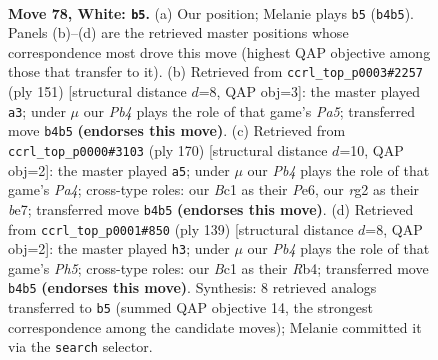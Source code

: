 \documentclass[11pt]{article}
\begin{document}
\clearpage

\begin{figure}[p]\centering
\begin{subfigure}{0.46\textwidth}\centering
\resizebox{\linewidth}{!}{%
\newchessgame
\chessboard[
  setfen={4b2k/8/1R6/8/1P6/8/K1p3r1/2B5 w - - 8 78},
  showmover=false,
  pgfstyle=straightmove, color=movearrow, markmove={b4-b5}
]}
\caption{}
\end{subfigure}\hfill
\begin{subfigure}{0.46\textwidth}\centering
\resizebox{\linewidth}{!}{%
\newchessgame
\chessboard[
  setfen={4k3/8/3R4/8/p7/3P2K1/r7/8 b - - 3 76},
  showmover=false,
  pgfstyle=straightmove, color=movearrow, markmove={a4-a3}
]}
\caption{}
\end{subfigure}
\\[4pt]
\begin{subfigure}{0.46\textwidth}\centering
\resizebox{\linewidth}{!}{%
\newchessgame
\chessboard[
  setfen={1r6/4b2k/4P3/8/P1K5/8/8/R7 w - - 5 86},
  showmover=false,
  pgfstyle=straightmove, color=movearrow, markmove={a4-a5}
]}
\caption{}
\end{subfigure}\hfill
\begin{subfigure}{0.46\textwidth}\centering
\resizebox{\linewidth}{!}{%
\newchessgame
\chessboard[
  setfen={2K5/8/2P1k3/8/1r5p/8/8/2R5 b - - 0 70},
  showmover=false,
  pgfstyle=straightmove, color=movearrow, markmove={h4-h3}
]}
\caption{}
\end{subfigure}
\caption{\textbf{Move 78, White: \texttt{b5}.} (a) Our position; Melanie plays \texttt{b5} (\texttt{b4b5}). Panels (b)--(d) are the retrieved master positions whose correspondence most drove this move (highest QAP objective among those that transfer to it). (b) Retrieved from \texttt{ccrl\_top\_p0003\#2257} (ply 151) [structural distance $d$=8, QAP obj=3]: the master played \texttt{a3}; under $\mu$ our \emph{Pb4} plays the role of that game's \emph{Pa5}; transferred move \texttt{b4b5} \textbf{(endorses this move)}. (c) Retrieved from \texttt{ccrl\_top\_p0000\#3103} (ply 170) [structural distance $d$=10, QAP obj=2]: the master played \texttt{a5}; under $\mu$ our \emph{Pb4} plays the role of that game's \emph{Pa4}; cross-type roles: our \emph{B}c1 as their \emph{P}e6, our \emph{r}g2 as their \emph{b}e7; transferred move \texttt{b4b5} \textbf{(endorses this move)}. (d) Retrieved from \texttt{ccrl\_top\_p0001\#850} (ply 139) [structural distance $d$=8, QAP obj=2]: the master played \texttt{h3}; under $\mu$ our \emph{Pb4} plays the role of that game's \emph{Ph5}; cross-type roles: our \emph{B}c1 as their \emph{R}b4; transferred move \texttt{b4b5} \textbf{(endorses this move)}. Synthesis: 8 retrieved analogs transferred to \texttt{b5} (summed QAP objective 14, the strongest correspondence among the candidate moves); Melanie committed it via the \texttt{search} selector.}
\label{fig:thought-m154}
\end{figure}
\end{document}
